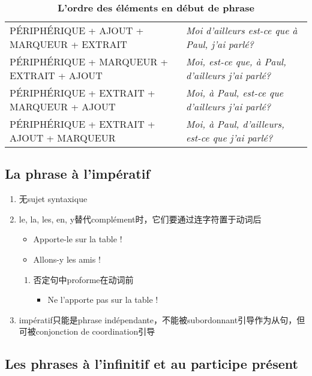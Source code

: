 \documentclass[UTF8]{report}
\begin{document}
\begin{table}[H]
\begin{adjustbox}{max width =\textwidth}
\begin{tabular}{|l|p{}|}
        PÉRIPHÉRIQUE + AJOUT + MARQUEUR + EXTRAIT & \textit{Moi d'ailleurs est-ce que à Paul, j'ai parlé?} \\
        PÉRIPHÉRIQUE + MARQUEUR + EXTRAIT + AJOUT & \textit{Moi, est-ce que, à Paul, d'ailleurs j'ai parlé?} \\
        PÉRIPHÉRIQUE + EXTRAIT + MARQUEUR + AJOUT & \textit{Moi, à Paul, est-ce que d'ailleurs j'ai parlé?} \\
        PÉRIPHÉRIQUE + EXTRAIT + AJOUT + MARQUEUR & \textit{Moi, à Paul, d'ailleurs, est-ce que j'ai parlé?} \\
        \hline
        \end{tabular}
    \end{adjustbox}
    \caption{\textbf{L'ordre des éléments en début de phrase}}
\end{table}

\subsection{La phrase à l’impératif}
\begin{enumerate}
    \item 无sujet syntaxique
    \item le, la, les, en, y替代complément时，它们要通过连字符置于动词后
    \begin{itemize}
        \item Apporte-le sur la table !
        \item Allons-y les amis !
    \end{itemize}
    \begin{enumerate}
        \item 否定句中proforme在动词前
        \begin{itemize}
            \item Ne l’apporte pas sur la table !
        \end{itemize}
    \end{enumerate}
    \item impératif只能是phrase indépendante，不能被subordonnant引导作为从句，但可被conjonction de coordination引导
\end{enumerate}

\subsection{Les phrases à l’infinitif et au participe présent}
\end{document}
